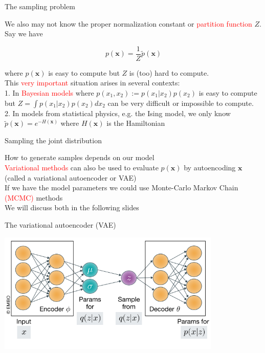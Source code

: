 \documentclass{beamer}					%
\begin{document}
\begin{frame}{The sampling problem}

We also may not know the proper normalization constant or \textcolor{red}{partition function} $Z$. Say we have

\begin{equation*}
p(\mathbf{x}) = \frac{1}{Z}\tilde{p}(\mathbf{x})
\end{equation*}

where $p(\mathbf{x})$ is easy to compute but $Z$ is (too) hard to compute.\\
\vspace{0.1in}
This \textcolor{red}{very important} situation arises in several contexts:\\
\vspace{0.1in}
1. In \textcolor{red}{Bayesian models} where $p(x_{1},x_{2}) := p(x_{1}|x_{2})p(x_{2})$ is easy to compute but
$Z = \int p(x_{1}|x_{2})p(x_{2})dx_{2}$ can be very difficult or impossible to
compute.\\
\vspace{0.1in}
2. In models from statistical physics, e.g. the Ising model, we only know
$\tilde{p}(\mathbf{x}) = e^{−H(\mathbf{x})}$ where $H(\mathbf{x})$ is the Hamiltonian

\end{frame}


\begin{frame}{Sampling the joint distribution}

How to generate samples depends on our model\\
\vspace{0.1in}
\textcolor{red}{Variational methods} can also be used to evaluate $p(\mathbf{x})$ by autoencoding $\mathbf{x}$ (called a variational autoencoder or VAE)\\
\vspace{0.1in}
If we have the model parameters we could use Monte-Carlo Markov Chain \textcolor{red}{(MCMC)} methods\\
\vspace{0.1in}
We will discuss both in the following slides
\end{frame}

\begin{frame}{The variational autoencoder (VAE)}

\begin{center}
\includegraphics[width=0.8\textwidth]{vae}
\end{center}

\end{frame}
\end{document}
